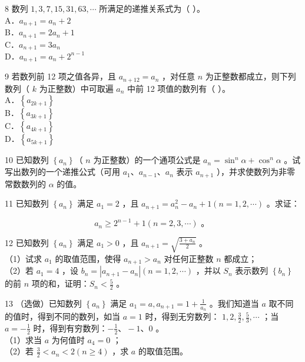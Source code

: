 \documentclass[10pt]{article}
\begin{document}
8 数列 \(1,3,7,15,31,63, \cdots\) 所满足的递推关系式为（ ）。\\
A．\(a_{n+1}=a_{n}+2\)\\
B．\(a_{n+1}=2 a_{n}+1\)\\
C．\(a_{n+1}=3 a_{n}\)\\
D．\(a_{n+1}=a_{n}+2^{n-1}\)

9 若数列前 12 项之值各异，且 \(a_{n+12}=a_{n}\) ，对任意 \(n\) 为正整数都成立，则下列数列（ \(k\) 为正整数）中可取遍 \(a_{n}\) 中前 12 项值的数列有（ ）。\\
A．\(\left\{a_{2 k+1}\right\}\)\\
B．\(\left\{a_{3 k+1}\right\}\)\\
C．\(\left\{a_{4 k+1}\right\}\)\\
D．\(\left\{a_{5 k+1}\right\}\)

10 已知数列 \(\left\{a_{n}\right\}\)（ \(n\) 为正整数）的一个通项公式是 \(a_{n}=\sin ^{n} \alpha+\cos ^{n} \alpha\) 。试写出数列的一个递推公式（可用 \(a_{1} 、 a_{n-1} 、 a_{n}\) 表示 \(a_{n+1}\) ），并求使数列为非零常数数列的 \(\alpha\) 的值。

11 已知数列 \(\left\{a_{n}\right\}\) 满足 \(a_{1}=2\) ，且 \(a_{n+1}=a_{n}^{2}-a_{n}+1(n=1,2, \cdots)\) 。求证：

\[
a_{n} \geqslant 2^{n-1}+1(n=2,3, \cdots) \text { 。 }
\]

12 已知数列 \(\left\{a_{n}\right\}\) 满足 \(a_{1}>0\) ，且 \(a_{n+1}=\sqrt{\frac{3+a_{n}}{2}}\) 。\\
（1）试求 \(a_{1}\) 的取值范围，使得 \(a_{n+1}>a_{n}\) 对任何正整数 \(n\) 都成立；\\
（2）若 \(a_{1}=4\) ，设 \(b_{n}=\left|a_{n+1}-a_{n}\right|(n=1,2, \cdots)\) ，并以 \(S_{n}\) 表示数列 \(\left\{b_{n}\right\}\) 的前 \(n\) 项的和，证明：\(S_{n}<\frac{5}{2}\) 。

13 （选做）已知数列 \(\left\{a_{n}\right\}\) 满足 \(a_{1}=a, a_{n+1}=1+\frac{1}{a_{n}}\) 。我们知道当 \(a\) 取不同的值时，得到不同的数列，如当 \(a=1\) 时，得到无穷数列： \(1,2, \frac{3}{2}, \frac{5}{3}, \cdots\) ；当 \(a=-\frac{1}{2}\) 时，得到有穷数列：\(-\frac{1}{2} 、-1 、 0\) 。\\
（1）求当 \(a\) 为何值时 \(a_{4}=0\) ；\\
（2）若 \(\frac{3}{2}<a_{n}<2(n \geqslant 4)\) ，求 \(a\) 的取值范围。
\end{document}
